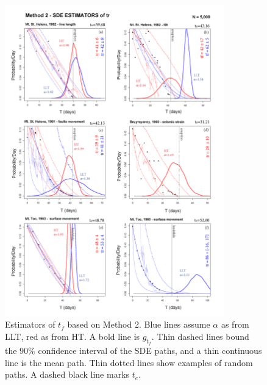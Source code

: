 \documentclass{article}
\begin{document}
\begin{figure}[H]\vskip-0.5cm
\centering
\includegraphics[width=0.85\textwidth]{Fig6_plus.png}
\caption{Estimators of $t_f$ based on Method 2. Blue lines assume $\alpha$ as from LLT, red as from HT. A bold line is $g_{t_f}$. Thin dashed lines bound the $90\%$ confidence interval of the SDE paths, and a thin continuous line is the mean path. Thin dotted lines show examples of random paths. A dashed black line marks $t_e$.}
\label{Fig6}
\end{figure}
\end{document}
